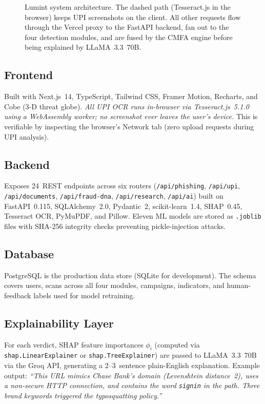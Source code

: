 \documentclass[conference]{IEEEtran}
\begin{document}
\begin{figure}[t]
\caption{Lumint system architecture. The dashed path (Tesseract.js in
the browser) keeps UPI screenshots on the client. All other requests
flow through the Vercel proxy to the FastAPI backend, fan out to the
four detection modules, and are fused by the CMFA engine before being
explained by LLaMA~3.3~70B.}
\label{fig:arch}
\end{figure}

\subsection{Frontend}
Built with Next.js~14, TypeScript, Tailwind CSS, Framer Motion,
Recharts, and Cobe (3-D threat globe). \emph{All UPI OCR runs in-browser
via Tesseract.js~5.1.0 using a WebAssembly worker; no screenshot ever
leaves the user's device.} This is verifiable by inspecting the
browser's Network tab (zero upload requests during UPI analysis).

\subsection{Backend}
Exposes 24~REST endpoints across six routers
(\texttt{/api/phishing}, \texttt{/api/upi}, \texttt{/api/documents},
\texttt{/api/fraud-dna}, \texttt{/api/research}, \texttt{/api/ai})
built on FastAPI~0.115, SQLAlchemy~2.0, Pydantic~2, scikit-learn~1.4,
SHAP~0.45, Tesseract OCR, PyMuPDF, and Pillow. Eleven ML models are
stored as \texttt{.joblib} files with SHA-256 integrity checks
preventing pickle-injection attacks.

\subsection{Database}
PostgreSQL is the production data store (SQLite for development). The
schema covers users, scans across all four modules, campaigns,
indicators, and human-feedback labels used for model retraining.

\subsection{Explainability Layer}
For each verdict, SHAP feature importances $\phi_i$ (computed via
\texttt{shap.LinearExplainer} or \texttt{shap.TreeExplainer}) are
passed to LLaMA~3.3~70B via the Groq API, generating a 2--3~sentence
plain-English explanation. Example output: \textit{``This URL mimics
Chase Bank's domain (Levenshtein distance~2), uses a non-secure HTTP
connection, and contains the word \texttt{signin} in the path. Three
brand keywords triggered the typosquatting policy.''}
\end{document}
